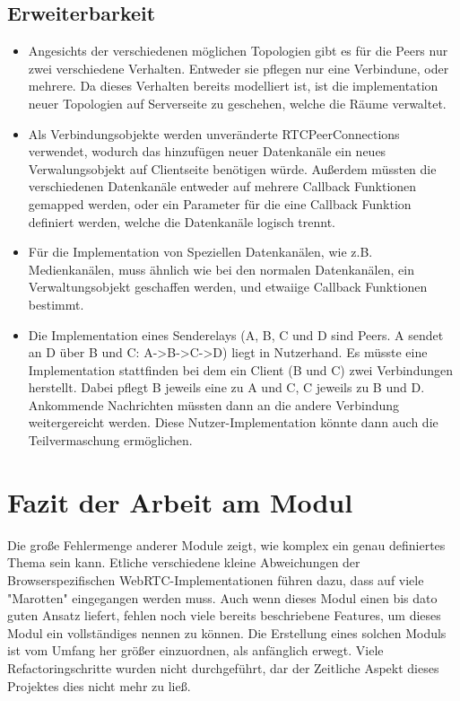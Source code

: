\subsection{Erweiterbarkeit}
\begin{itemize}
\item
Angesichts der verschiedenen möglichen Topologien gibt es für die Peers nur zwei verschiedene Verhalten. 
Entweder sie pflegen nur eine Verbindune, oder mehrere.
Da dieses Verhalten bereits modelliert ist, ist die implementation neuer Topologien auf Serverseite zu geschehen, welche die Räume verwaltet.

\item
Als Verbindungsobjekte werden unveränderte RTCPeerConnections verwendet, wodurch das hinzufügen neuer Datenkanäle ein neues Verwalungsobjekt auf Clientseite benötigen würde.
Außerdem müssten die verschiedenen Datenkanäle entweder auf mehrere Callback Funktionen gemapped werden, oder ein Parameter für die eine Callback Funktion definiert werden, welche die Datenkanäle logisch trennt.

\item
Für die Implementation von Speziellen Datenkanälen, wie z.B. Medienkanälen, muss ähnlich wie bei den normalen Datenkanälen, ein Verwaltungsobjekt geschaffen werden, und etwaiige Callback Funktionen bestimmt.

\item
Die Implementation eines Senderelays (A, B, C und D sind Peers. A sendet an D über B und C: A->B->C->D) liegt in Nutzerhand. Es müsste eine Implementation stattfinden bei dem ein Client (B und C) zwei Verbindungen herstellt. 
Dabei pflegt B jeweils eine zu A und C, C jeweils zu B und D.
Ankommende Nachrichten müssten dann an die andere Verbindung weitergereicht werden.
Diese Nutzer-Implementation könnte dann auch die Teilvermaschung ermöglichen.
\end{itemize}



\section{Fazit der Arbeit am Modul}
Die große Fehlermenge anderer Module zeigt, wie komplex ein genau definiertes Thema sein kann.
Etliche verschiedene kleine Abweichungen der Browserspezifischen WebRTC-Implementationen führen dazu, dass auf viele "Marotten" eingegangen werden muss.
Auch wenn dieses Modul einen bis dato guten Ansatz liefert, fehlen noch viele bereits beschriebene Features, um dieses Modul ein vollständiges nennen zu können.
Die Erstellung eines solchen Moduls ist vom Umfang her größer einzuordnen, als anfänglich erwegt. 
Viele Refactoringschritte wurden nicht durchgeführt, dar der Zeitliche Aspekt dieses Projektes dies nicht mehr zu ließ.
